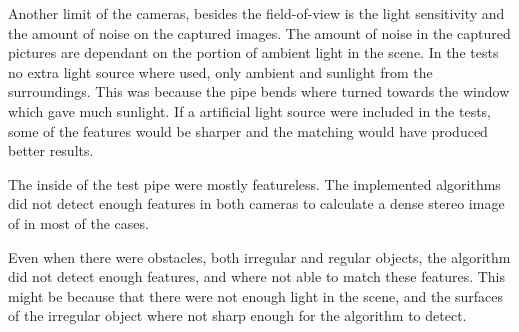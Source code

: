 Another limit of the cameras, besides the field-of-view is the light sensitivity and
the amount of noise on the captured images. The amount of noise in the captured pictures
are dependant on the portion of ambient light in the scene. In the tests no extra
light source where used, only ambient and sunlight from the surroundings. This was because
the pipe bends where turned towards the window which gave much sunlight. If a artificial
light source were included in the tests, some of the features would be sharper and the
matching would have produced better results. 

The inside of the test pipe were mostly featureless. The implemented algorithms did not
detect enough features in both cameras to calculate a dense stereo image of in most of the
cases. 

Even when there were obstacles, both irregular and regular objects, the algorithm did not
detect enough features, and where not able to match these features. This might be because
that there were not enough light in the scene, and the surfaces of the irregular object
where not sharp enough for the algorithm to detect. 

